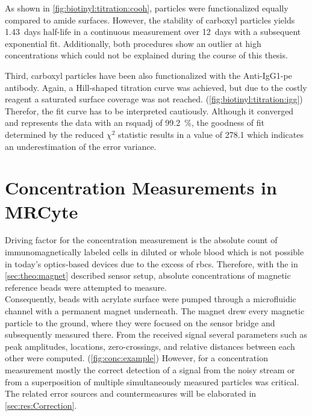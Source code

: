 As shown in \cref{fig:biotinyl:titration:cooh}, particles were functionalized equally compared to \gls{amide} surfaces. However, the stability of \gls{carboxyl} particles yields \SI{1.43}{days} half-life in a continuous measurement over \SI{12}{days} with a subsequent exponential fit. Additionally, both procedures show an outlier at high concentrations which could not be explained during the course of this thesis. 

Third, \gls{carboxyl} particles have been also functionalized with the Anti-IgG1-\gls{pe} antibody. Again, a Hill-shaped titration curve was achieved, but due to the costly reagent a saturated surface coverage was not reached. (\cref{fig:biotinyl:titration:igg}) \\
Therefor, the fit curve has to be interpreted cautiously. Although it converged and represents the data with an \gls{rsquadj} of \SI{99.2}{\percent}, the goodness of fit determined by the reduced $\chi^2$ statistic results in a value of \num{278.1} which indicates an underestimation of the error variance.

\clearpage
\section{Concentration Measurements in MRCyte}
Driving factor for the concentration measurement is the absolute count of immunomagnetically labeled cells in diluted or whole blood which is not possible in today's optics-based devices due to the excess of \glspl{rbc}.\cite{lit:bio:Alberts} Therefore, with the in \cref{sec:theo:magnet} described sensor setup, absolute concentrations of magnetic reference beads were attempted to measure.\\
Consequently, beads with acrylate surface were pumped through a microfluidic channel with a permanent magnet underneath. The magnet drew every magnetic particle to the ground, where they were focused on the sensor bridge and subsequently measured there. From the received signal several parameters such as peak amplitudes, locations, zero-crossings, and relative distances between each other were computed. (\cref{fig:conc:example}) However, for a concentration measurement mostly the correct detection of a signal from the noisy stream or from a superposition of multiple simultaneously measured particles was critical. The related error sources and countermeasures will be elaborated in \cref{sec:res:Correction}.

